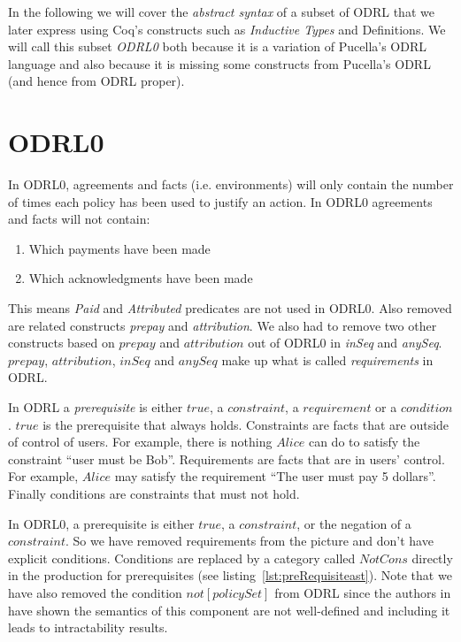 In the following we will cover the \emph{abstract syntax} of a subset of ODRL that we later express using Coq's constructs such as \emph{Inductive Types} and Definitions. We will call this subset \emph{ODRL0} both because it is a variation of Pucella's ODRL language and also because it is missing some constructs from Pucella's ODRL (and hence from ODRL proper). 

\section{ODRL0}\label{sec:odrl0}
In ODRL0, agreements and facts (i.e. environments) will only contain the number of times each policy has been used to justify an action. In ODRL0 agreements and facts will not contain: \begin{enumerate}
  \item Which payments have been made
  \item Which acknowledgments have been made
\end{enumerate} 

This means \emph{Paid} and \emph{Attributed} predicates are not used in ODRL0. Also removed are related constructs \emph{prepay} and \emph{attribution}. We also had to remove two other constructs based on $prepay$ and $attribution$ out of ODRL0 in \emph{inSeq} and \emph{anySeq}. $prepay$, $attribution$, $inSeq$ and $anySeq$ make up what is called \emph{requirements} in ODRL.

In ODRL a \emph{prerequisite} is either $true$, a $constraint$, a $requirement$ or a $condition$. $true$ is the prerequisite that always holds. Constraints are facts that are outside of control of users. For example, there is nothing $Alice$ can do to satisfy the constraint ``user must be Bob''. Requirements are facts that are in users' control. For example, $Alice$ may satisfy the requirement ``The user must pay 5 dollars''. Finally conditions are constraints that must not hold.

In ODRL0, a prerequisite is either $true$, a $constraint$, or the negation of a $constraint$. So we have removed requirements from the picture and don't have explicit conditions. Conditions are replaced by a category called $NotCons$ directly in the production for prerequisites (see listing~\ref{lst:preRequisiteast}). Note that we have also removed the condition $not[policySet]$ from ODRL since the authors in \cite{pucella2006} have shown the semantics of this component are not well-defined and including it leads to intractability results.

